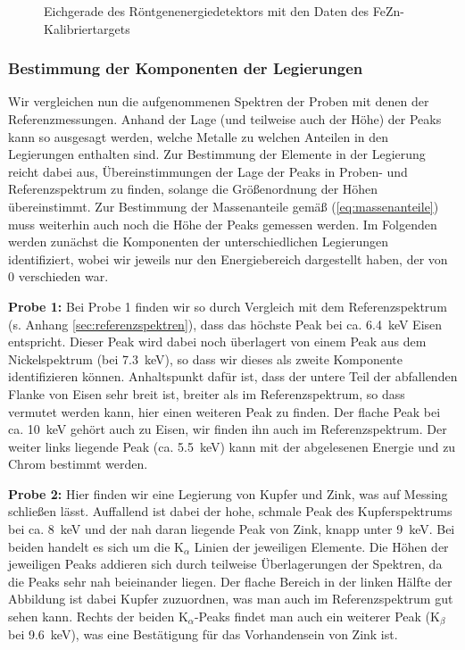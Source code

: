 \documentclass[11pt, a4paper]{article}
\begin{document}
\begin{figure}[h]
\centering
\resizebox{\columnwidth}{!}{%
}
\caption{Eichgerade des Röntgenenergiedetektors mit den Daten des FeZn-Kalibriertargets}
\label{fig:energieeichung}
\end{figure}

\subsubsection{Bestimmung der Komponenten der Legierungen}

Wir vergleichen nun die aufgenommenen Spektren der Proben mit denen der Referenzmessungen.
Anhand der Lage (und teilweise auch der Höhe) der Peaks kann so ausgesagt werden, welche Metalle zu welchen Anteilen in den Legierungen enthalten sind.
Zur Bestimmung der Elemente in der Legierung reicht dabei aus, Übereinstimmungen der Lage der Peaks in Proben- und Referenzspektrum zu finden, solange die Größenordnung der Höhen übereinstimmt.
Zur Bestimmung der Massenanteile gemäß (\ref{eq:massenanteile}) muss weiterhin auch noch die Höhe der Peaks gemessen werden.
Im Folgenden werden zunächst die Komponenten der unterschiedlichen Legierungen identifiziert, wobei wir jeweils nur den Energiebereich dargestellt haben, der von $0$ verschieden war.

\textbf{Probe 1:} Bei Probe 1 finden wir so durch Vergleich mit dem Referenzspektrum (s. Anhang \ref{sec:referenzspektren}), dass das höchste Peak bei ca. \SI{6.4}{\kilo\electronvolt} Eisen entspricht.
Dieser Peak wird dabei noch überlagert von einem Peak aus dem Nickelspektrum (bei \SI{7.3}{\kilo\electronvolt}), so dass wir dieses als zweite Komponente identifizieren können.
Anhaltspunkt dafür ist, dass der untere Teil der abfallenden Flanke von Eisen sehr breit ist, breiter als im Referenzspektrum, so dass vermutet werden kann, hier einen weiteren Peak zu finden.
Der flache Peak bei ca. \SI{10}{\kilo\electronvolt} gehört auch zu Eisen, wir finden ihn auch im Referenzspektrum.
Der weiter links liegende Peak (ca. \SI{5.5}{\kilo\electronvolt}) kann mit der abgelesenen Energie und \cite{booklet} zu Chrom bestimmt werden.



\textbf{Probe 2:} Hier finden wir eine Legierung von Kupfer und Zink, was auf Messing schließen lässt.
Auffallend ist dabei der hohe, schmale Peak des Kupferspektrums bei ca. \SI{8}{\kilo\electronvolt} und der nah daran liegende Peak von Zink, knapp unter \SI{9}{\kilo\electronvolt}.
Bei beiden handelt es sich um die K$_{\alpha}$ Linien der jeweiligen Elemente.
Die Höhen der jeweiligen Peaks addieren sich durch teilweise Überlagerungen der Spektren, da die Peaks sehr nah beieinander liegen.
Der flache Bereich in der linken Hälfte der Abbildung ist dabei Kupfer zuzuordnen, was man auch im Referenzspektrum gut sehen kann.
Rechts der beiden K$_{\alpha}$-Peaks findet man auch ein weiterer Peak (K$_{\beta}$ bei \SI{9.6}{\kilo\electronvolt}), was eine Bestätigung für das Vorhandensein von Zink ist.
\end{document}
